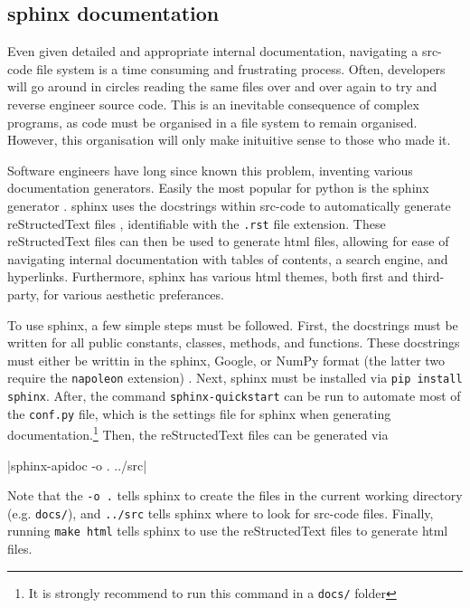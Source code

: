 \documentclass[11pt]{article}
\begin{document}
\inputminted[linenos=true]{python}{python_examples/docstring.py}

\subsection{\Gls{sphinx} documentation}

Even given detailed and appropriate internal documentation, navigating a \gls{src-code} file system is a time consuming and frustrating process. Often, developers will go around in circles reading the same files over and over again to try and reverse engineer source code. This is an inevitable consequence of complex programs, as code must be organised in a file system to remain organised. However, this organisation will only make inituitive sense to those who made it.

Software engineers have long since known this problem, inventing various documentation generators. Easily the most popular for \Gls{python} is the \Gls{sphinx} generator \cite{sphinx}. \Gls{sphinx} uses the \glspl{docstring} within \gls{src-code} to automatically generate reStructedText files \cite{rst}, identifiable with the \texttt{.rst} file extension. These reStructedText files can then be used to generate \acrshort{html} files, allowing for ease of navigating internal documentation with tables of contents, a search engine, and hyperlinks. Furthermore, \Gls{sphinx} has various \acrshort{html} themes, both first and third-party, for various aesthetic preferances.

To use \Gls{sphinx}, a few simple steps must be followed. First, the \glspl{docstring} must be written for all public constants, classes, methods, and functions. These \glspl{docstring} must either be writtin in the \Gls{sphinx}, Google, or NumPy format (the latter two require the \texttt{napoleon} extension) \cite{sphinx-napolean}. Next, \Gls{sphinx} must be installed via \texttt{pip install sphinx}. After, the command \texttt{sphinx-quickstart} can be run to automate most of the \texttt{conf.py} file, which is the settings file for \Gls{sphinx} when generating documentation.\footnote{It is strongly recommend to run this command in a \texttt{docs/} folder} Then, the reStructedText files can be generated via

|sphinx-apidoc -o . ../src|

\noindent
Note that the \texttt{-o .} tells \Gls{sphinx} to create the files in the current working directory (e.g. \texttt{docs/}), and \texttt{../src} tells \Gls{sphinx} where to look for \gls{src-code} files. Finally, running \texttt{make html} tells \Gls{sphinx} to use the reStructedText files to generate \acrshort{html} files.
\end{document}

